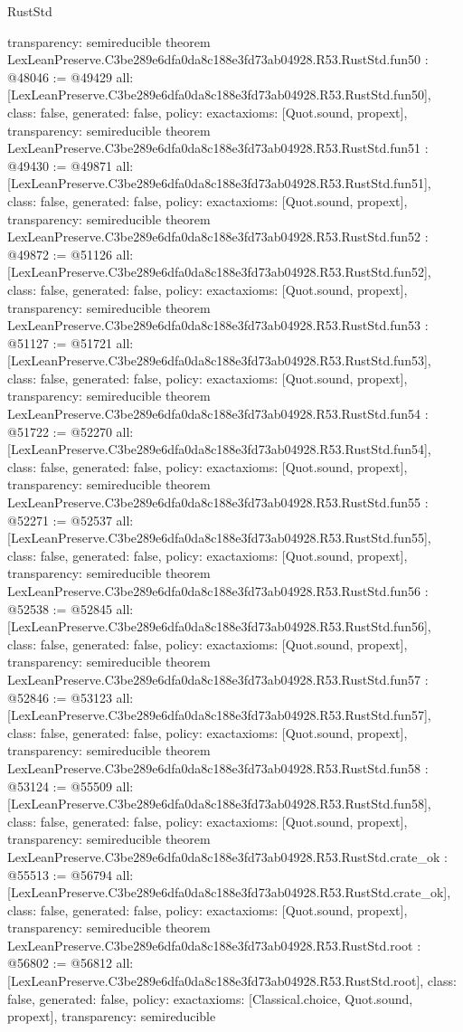 \begin{lexlean}{RustStd}
\begin{coremodule}
{  transparency: semireducible
}
theorem LexLeanPreserve.C3be289e6dfa0da8c188e3fd73ab04928.R53.RustStd.fun50 : @48046 := @49429 {
  all: [LexLeanPreserve.C3be289e6dfa0da8c188e3fd73ab04928.R53.RustStd.fun50],
  class: false,
  generated: false,
  policy: exact{axioms: [Quot.sound, propext]},
  transparency: semireducible
}
theorem LexLeanPreserve.C3be289e6dfa0da8c188e3fd73ab04928.R53.RustStd.fun51 : @49430 := @49871 {
  all: [LexLeanPreserve.C3be289e6dfa0da8c188e3fd73ab04928.R53.RustStd.fun51],
  class: false,
  generated: false,
  policy: exact{axioms: [Quot.sound, propext]},
  transparency: semireducible
}
theorem LexLeanPreserve.C3be289e6dfa0da8c188e3fd73ab04928.R53.RustStd.fun52 : @49872 := @51126 {
  all: [LexLeanPreserve.C3be289e6dfa0da8c188e3fd73ab04928.R53.RustStd.fun52],
  class: false,
  generated: false,
  policy: exact{axioms: [Quot.sound, propext]},
  transparency: semireducible
}
theorem LexLeanPreserve.C3be289e6dfa0da8c188e3fd73ab04928.R53.RustStd.fun53 : @51127 := @51721 {
  all: [LexLeanPreserve.C3be289e6dfa0da8c188e3fd73ab04928.R53.RustStd.fun53],
  class: false,
  generated: false,
  policy: exact{axioms: [Quot.sound, propext]},
  transparency: semireducible
}
theorem LexLeanPreserve.C3be289e6dfa0da8c188e3fd73ab04928.R53.RustStd.fun54 : @51722 := @52270 {
  all: [LexLeanPreserve.C3be289e6dfa0da8c188e3fd73ab04928.R53.RustStd.fun54],
  class: false,
  generated: false,
  policy: exact{axioms: [Quot.sound, propext]},
  transparency: semireducible
}
theorem LexLeanPreserve.C3be289e6dfa0da8c188e3fd73ab04928.R53.RustStd.fun55 : @52271 := @52537 {
  all: [LexLeanPreserve.C3be289e6dfa0da8c188e3fd73ab04928.R53.RustStd.fun55],
  class: false,
  generated: false,
  policy: exact{axioms: [Quot.sound, propext]},
  transparency: semireducible
}
theorem LexLeanPreserve.C3be289e6dfa0da8c188e3fd73ab04928.R53.RustStd.fun56 : @52538 := @52845 {
  all: [LexLeanPreserve.C3be289e6dfa0da8c188e3fd73ab04928.R53.RustStd.fun56],
  class: false,
  generated: false,
  policy: exact{axioms: [Quot.sound, propext]},
  transparency: semireducible
}
theorem LexLeanPreserve.C3be289e6dfa0da8c188e3fd73ab04928.R53.RustStd.fun57 : @52846 := @53123 {
  all: [LexLeanPreserve.C3be289e6dfa0da8c188e3fd73ab04928.R53.RustStd.fun57],
  class: false,
  generated: false,
  policy: exact{axioms: [Quot.sound, propext]},
  transparency: semireducible
}
theorem LexLeanPreserve.C3be289e6dfa0da8c188e3fd73ab04928.R53.RustStd.fun58 : @53124 := @55509 {
  all: [LexLeanPreserve.C3be289e6dfa0da8c188e3fd73ab04928.R53.RustStd.fun58],
  class: false,
  generated: false,
  policy: exact{axioms: [Quot.sound, propext]},
  transparency: semireducible
}
theorem LexLeanPreserve.C3be289e6dfa0da8c188e3fd73ab04928.R53.RustStd.crate_ok : @55513 := @56794 {
  all: [LexLeanPreserve.C3be289e6dfa0da8c188e3fd73ab04928.R53.RustStd.crate_ok],
  class: false,
  generated: false,
  policy: exact{axioms: [Quot.sound, propext]},
  transparency: semireducible
}
theorem LexLeanPreserve.C3be289e6dfa0da8c188e3fd73ab04928.R53.RustStd.root : @56802 := @56812 {
  all: [LexLeanPreserve.C3be289e6dfa0da8c188e3fd73ab04928.R53.RustStd.root],
  class: false,
  generated: false,
  policy: exact{axioms: [Classical.choice, Quot.sound, propext]},
  transparency: semireducible
}


\end{coremodule}
\end{lexlean}
